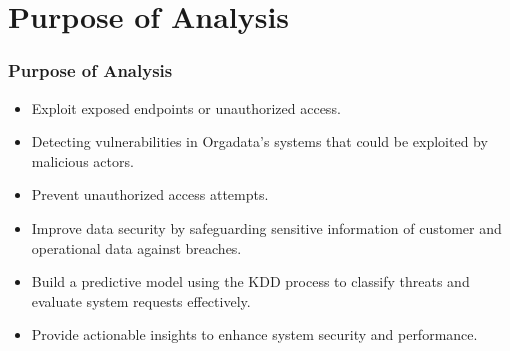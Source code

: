 \documentclass[10pt, a4paper]{beamer}
\begin{document}
	\section{Purpose of Analysis}
	\begin{frame}
		\frametitle{Purpose of Analysis}
		
		\begin{block}{}
			\begin{itemize}
				\item Exploit exposed endpoints or unauthorized access.
				\item Detecting vulnerabilities in Orgadata's systems that could be exploited by malicious actors.
				\item Prevent unauthorized access attempts.
				\item Improve data security by safeguarding sensitive information of customer and operational data against breaches.
				\item Build a predictive model using the KDD process to classify threats and evaluate system requests effectively.
				\item Provide actionable insights to enhance system security and performance.
			\end{itemize}
		\end{block}
		
	\end{frame}
	
	
\end{document}
